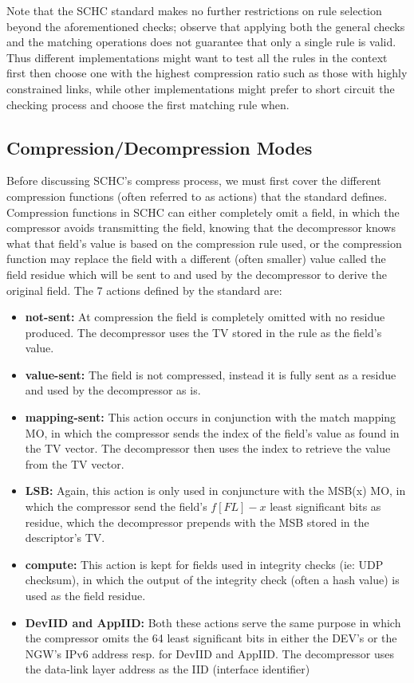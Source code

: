 \documentclass[12pt]{dalthesis}
\begin{document}
	Note that the SCHC standard makes no further restrictions on rule selection beyond the aforementioned checks; observe that applying both the 
	general checks and the matching operations does not guarantee
	that only a single rule is valid. Thus different implementations might want to test all the rules in the context first then choose one
	with the highest compression ratio such as those with highly constrained links, while other implementations might prefer to short circuit the checking process and choose the first matching
	rule when. 
	

	\subsection{Compression/Decompression Modes}
	Before discussing SCHC's compress process, we must first cover the different compression functions (often referred to as
	actions) that the standard defines. Compression functions in SCHC can either completely omit a field, in which the compressor
	avoids transmitting the field, knowing that the decompressor knows what that field's value is based on the compression rule used, or
	the compression function may replace the field with a different (often smaller) value called the field residue which will be sent 
	to and used by the decompressor to derive the original field. The 7 actions defined by the standard are:
	\begin{itemize}
		\item \textbf{not-sent:} At compression the field is completely omitted with no residue produced. The decompressor uses the TV stored
			in the rule as the field's value.
		\item \textbf{value-sent:} The field is not compressed, instead it is fully sent as a residue and used by the decompressor as is.
		\item \textbf{mapping-sent:} This action occurs in conjunction with the match mapping MO, in which the compressor
			sends the index of the field's value as found in the TV vector. The decompressor then uses the index to retrieve the value from the TV
			vector.
		\item \textbf{LSB:} Again, this action is only used in conjuncture with the MSB(x) MO, in which the compressor send the field's
			$f[FL]-x$ least significant bits as residue, which the decompressor prepends with the MSB stored in the descriptor's TV.
		\item \textbf{compute:} This action is kept for fields used in integrity checks (ie: UDP checksum), in which the output of the 
			integrity check (often a hash value) is used as the field residue.
		\item \textbf{DevIID and AppIID:} Both these actions serve the same purpose in which the compressor omits the 64 least significant
			bits in either the DEV's or the NGW's IPv6 address resp. for DevIID and AppIID. The decompressor uses the data-link layer address
			as the IID (interface identifier)
	\end{itemize}
\end{document}
